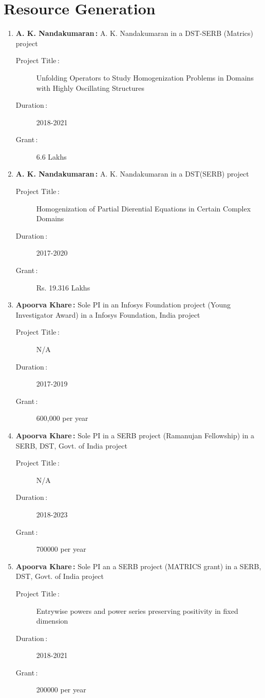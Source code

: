 \section{Resource Generation}

\begin{enumerate}

\item {\bf A. K. Nandakumaran\,:} A. K. Nandakumaran in a DST-SERB (Matrics) project
\begin{description}
  \item[Project Title\,:] Unfolding Operators to Study Homogenization Problems in Domains with Highly Oscillating Structures
  \item[Duration\,:] 2018-2021
  \item[Grant\,:] 6.6 Lakhs
\end{description}


\item {\bf A. K. Nandakumaran\,:} A. K. Nandakumaran in a DST(SERB) project
\begin{description}
  \item[Project Title\,:] Homogenization of Partial Dierential Equations in Certain Complex Domains
  \item[Duration\,:] 2017-2020
  \item[Grant\,:] Rs. 19.316 Lakhs
\end{description}


\item {\bf Apoorva Khare\,:} Sole PI in an Infosys Foundation project (Young Investigator Award) in a Infosys Foundation, India project
\begin{description}
  \item[Project Title\,:] N/A
  \item[Duration\,:] 2017-2019
  \item[Grant\,:] 600,000 per year
\end{description}


\item {\bf Apoorva Khare\,:} Sole PI in a SERB project (Ramanujan Fellowship) in a SERB, DST, Govt. of India project
\begin{description}
  \item[Project Title\,:] N/A
  \item[Duration\,:] 2018-2023
  \item[Grant\,:] 700000 per year
\end{description}


\item {\bf Apoorva Khare\,:} Sole PI an a SERB project (MATRICS grant) in a SERB, DST, Govt. of India project
\begin{description}
  \item[Project Title\,:] Entrywise powers and power series preserving positivity in fixed dimension
  \item[Duration\,:] 2018-2021
  \item[Grant\,:] 200000 per year
\end{description}



\end{enumerate}
